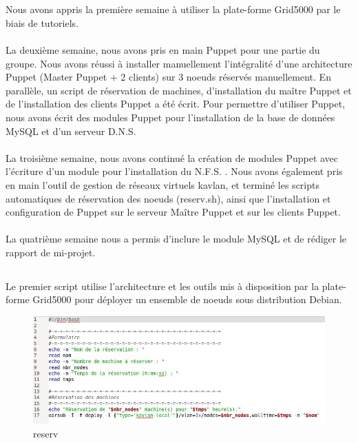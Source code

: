 \documentclass[a4paper, 10pt, onecolumn]{report}
\begin{document}
\section{}
\subsection{}
Nous avons appris la première semaine à utiliser la plate-forme Grid5000 par le biais de
tutoriels.\\
\\
La deuxième semaine, nous avons pris en main Puppet pour une partie du groupe.
Nous avons réussi à installer manuellement l’intégralité d’une architecture Puppet (Master
Puppet + 2 clients) sur 3 noeuds réservés manuellement. En parallèle, un script de réservation
de machines, d’installation du maître Puppet et de l’installation des clients Puppet a été écrit.
Pour permettre d’utiliser Puppet, nous avons écrit des modules Puppet pour l’installation de la
base de données MySQL et d’un serveur D.N.S. \\
\\
La troisième semaine, nous avons continué la création de modules Puppet avec
l’écriture d’un module pour l’installation du N.F.S. . Nous avons également pris en main l’outil
de gestion de réseaux virtuels kavlan, et terminé les scripts automatiques de réservation des
noeuds (reserv.sh), ainsi que l'installation et configuration de Puppet sur le serveur Maître
Puppet et sur les clients Puppet.\\
\\
La quatrième semaine nous a permis d’inclure le module MySQL et de rédiger le rapport
de mi-projet.
\newpage
\subsection{}
\subsubsection{}
Le premier script utilise l’architecture et les outils mis à disposition par la plate-forme
Grid5000 pour déployer un ensemble de noeuds sous distribution Debian.

\begin{figure}[htb]
\begin{center}
\includegraphics[scale=0.550]{images/reserv}
\caption{reserv}
\end{center}
\end{figure}
\end{document}
